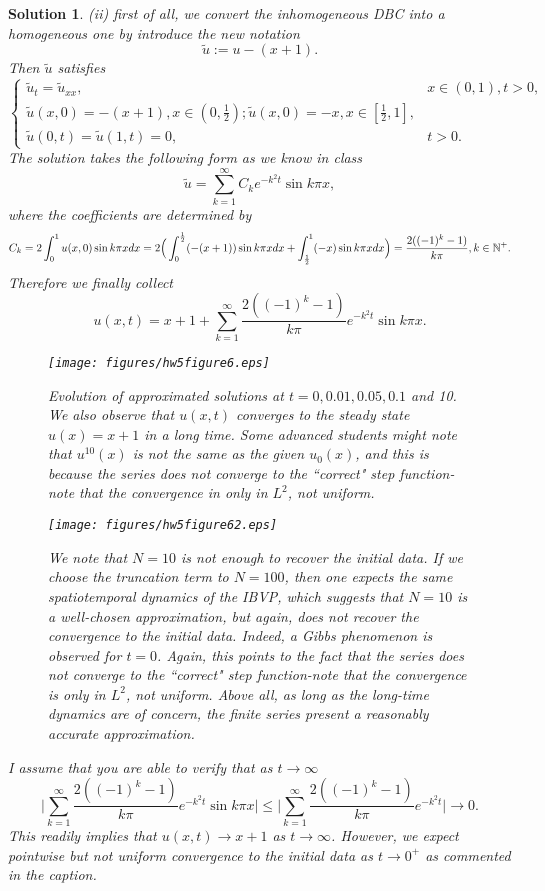 \documentclass[6pt]{article}
\newtheorem{solution}{Solution}
\numberwithin{equation}{section}
\def\mathbb{\Bbb}
\begin{document}
\begin{enumerate}
\begin{solution}
(ii) first of all, we convert the inhomogeneous DBC into a homogeneous one by introduce the new notation
\[\tilde u:=u-(x+1).\]
Then $\tilde u$ satisfies
\[
\left\{
\begin{array}{ll}
\tilde u_t=\tilde u_{xx},& x\in(0,1),t>0,\\
\tilde u(x,0)=-(x+1), x\in(0,\frac{1}{2}); \tilde u(x,0)=-x, x\in[\frac{1}{2},1],\\
\tilde u(0,t)=\tilde u(1,t)=0, &t>0.
\end{array}
\right.
\]
The solution takes the following form as we know in class
\[\tilde u=\sum_{k=1}^\infty C_k e^{-k^2 t}\sin k\pi x,\]
where the coefficients are determined by
\[C_k=2\int_0^1 u(x,0)\sin k\pi xdx=2\Big(\int_0^\frac{1}{2}(-(x+1))\sin k \pi xdx+\int_\frac{1}{2}^1 (-x)\sin k\pi xdx\Big)=\frac{2((-1)^k-1)}{k\pi},k\in\mathbb N^+.\]
Therefore we finally collect
\[u(x,t)=x+1+\sum_{k=1}^\infty \frac{2((-1)^k-1)}{k\pi}e^{-k^2 t}\sin k\pi x.\]
\begin{figure}[h]\vspace{-8mm}
  \centering
\texttt{[image: figures/hw5figure6.eps]}
\caption{Evolution of approximated solutions at $t=0,0.01,0.05,0.1$ and 10.  We also observe that $u(x,t)$ converges to the steady state $u(x)=x+1$ in a long time.  Some advanced students might note that $u^{10}(x)$ is not the same as the given $u_0(x)$, and this is because the series does not converge to the ``correct" step function-note that the convergence in only in $L^2$, not uniform.}\end{figure}


\begin{figure}[h!]
  \centering
\texttt{[image: figures/hw5figure62.eps]}
\caption{We note that $N=10$ is not enough to recover the initial data.  If we choose the truncation term to $N=100$, then one expects the same spatiotemporal dynamics of the IBVP, which suggests that $N=10$ is a well-chosen approximation, but again, does not recover the convergence to the initial data.  Indeed, a Gibbs phenomenon is observed for $t=0$.  Again, this points to the fact that the series does not converge to the ``correct" step function-note that the convergence is only in $L^2$, not uniform.  Above all, as long as the long-time dynamics are of concern, the finite series present a reasonably accurate approximation.}\end{figure}

I assume that you are able to verify that as $t\rightarrow \infty$
\[\Big|\sum_{k=1}^\infty \frac{2((-1)^k-1)}{k\pi}e^{-k^2 t}\sin k\pi x\Big|\leq \Big|\sum_{k=1}^\infty \frac{2((-1)^k-1)}{k\pi}e^{-k^2 t} \Big|\rightarrow 0.\]
This readily implies that $u(x,t)\rightarrow x+1$ as $t\rightarrow \infty$.  However, we expect pointwise but not uniform convergence to the initial data as $t\rightarrow 0^+$ as commented in the caption.
\end{solution}




\end{enumerate}
\end{document}
